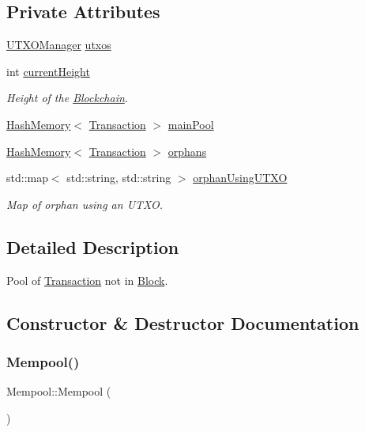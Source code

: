 \subsection*{Private Attributes}
\begin{DoxyCompactItemize}
\item 
\mbox{\hyperlink{classUTXOManager}{U\+T\+X\+O\+Manager}} \mbox{\hyperlink{classMempool_a84442d6065be70b7411d4376887c7858}{utxos}}
\item 
int \mbox{\hyperlink{classMempool_ad4ec0d1398ded82c7324a099b92b80cc}{current\+Height}}
\begin{DoxyCompactList}\small\item\em Height of the \mbox{\hyperlink{classBlockchain}{Blockchain}}. \end{DoxyCompactList}\item 
\mbox{\hyperlink{classHashMemory}{Hash\+Memory}}$<$ \mbox{\hyperlink{classTransaction}{Transaction}} $>$ \mbox{\hyperlink{classMempool_a6c0f587b34c99369786379717b0b1347}{main\+Pool}}
\item 
\mbox{\hyperlink{classHashMemory}{Hash\+Memory}}$<$ \mbox{\hyperlink{classTransaction}{Transaction}} $>$ \mbox{\hyperlink{classMempool_a215dd76ed87ac826511573e8fc91885a}{orphans}}
\item 
std\+::map$<$ std\+::string, std\+::string $>$ \mbox{\hyperlink{classMempool_a6a590208186b95856029bfa2613fbf04}{orphan\+Using\+U\+T\+XO}}
\begin{DoxyCompactList}\small\item\em Map of orphan using an U\+T\+XO. \end{DoxyCompactList}\end{DoxyCompactItemize}


\subsection{Detailed Description}
Pool of \mbox{\hyperlink{classTransaction}{Transaction}} not in \mbox{\hyperlink{classBlock}{Block}}. 

\subsection{Constructor \& Destructor Documentation}
\mbox{\label{classMempool_a7d26cf499215b7660b991b03f20937dd}} 
\subsubsection{\texorpdfstring{Mempool()}{Mempool()}}
{\footnotesize\ttfamily Mempool\+::\+Mempool (\begin{DoxyParamCaption}{ }\end{DoxyParamCaption})}



